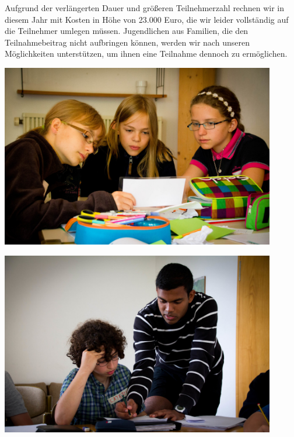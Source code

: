 \documentclass[12pt]{zettel}
\begin{document}
Aufgrund der verlängerten Dauer und größeren Teilnehmerzahl rechnen wir in diesem Jahr mit Kosten in Höhe von 23.000 Euro, die wir leider vollständig auf die Teilnehmer umlegen müssen. Jugendlichen aus Familien, die den Teilnahmebeitrag nicht aufbringen können, werden wir nach unseren Möglichkeiten unterstützen, um ihnen eine Teilnahme dennoch zu ermöglichen.


\vfill

\begin{minipage}{0.5\textwidth}
  \raggedright
   \includegraphics[width=0.9\textwidth]{impressionen/klein-08}
\end{minipage}%
\begin{minipage}{0.5\textwidth}
  \raggedleft
 \includegraphics[width=0.9\textwidth]{impressionen/klein-02}
\end{minipage}
\end{document}
